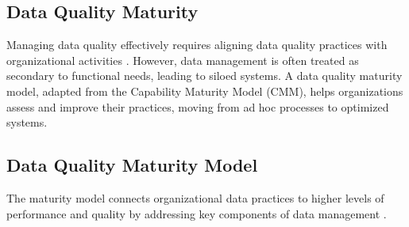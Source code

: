 \documentclass[conference]{IEEEtran}
\begin{document}
\subsection{Data Quality Maturity}

Managing data quality effectively requires aligning data quality practices with organizational activities \cite{loshin_dqi}. However, data management is often treated as secondary to functional needs, leading to siloed systems. A data quality maturity model, adapted from the Capability Maturity Model (CMM), helps organizations assess and improve their practices, moving from ad hoc processes to optimized systems.


\subsection{Data Quality Maturity Model}

The maturity model connects organizational data practices to higher levels of performance and quality by addressing key components of data management \cite{loshin_dqi}. 

\end{document}
